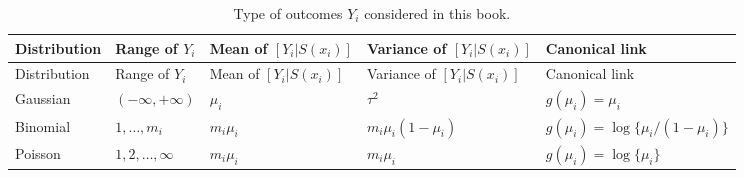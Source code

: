 \documentclass[
  letterpaper,
]{krantz}
\begin{document}
\begin{longtable}[]{@{}
  >{\raggedright\arraybackslash}p{}
  >{\raggedright\arraybackslash}p{}
  >{\raggedright\arraybackslash}p{}
  >{\raggedright\arraybackslash}p{}
  >{\raggedright\arraybackslash}p{}@{}}
\caption{Type of outcomes \(Y_{i}\) considered in this
book.}\label{tbl-glm}\tabularnewline
\toprule\noalign{}
\begin{minipage}[b]{\linewidth}\raggedright
Distribution
\end{minipage} & \begin{minipage}[b]{\linewidth}\raggedright
Range of \(Y_i\)
\end{minipage} & \begin{minipage}[b]{\linewidth}\raggedright
Mean of \([Y_i | S(x_i)]\)
\end{minipage} & \begin{minipage}[b]{\linewidth}\raggedright
Variance of \([Y_i | S(x_i)]\)
\end{minipage} & \begin{minipage}[b]{\linewidth}\raggedright
Canonical link
\end{minipage} \\
\midrule\noalign{}
\endfirsthead
\toprule\noalign{}
\begin{minipage}[b]{\linewidth}\raggedright
Distribution
\end{minipage} & \begin{minipage}[b]{\linewidth}\raggedright
Range of \(Y_i\)
\end{minipage} & \begin{minipage}[b]{\linewidth}\raggedright
Mean of \([Y_i | S(x_i)]\)
\end{minipage} & \begin{minipage}[b]{\linewidth}\raggedright
Variance of \([Y_i | S(x_i)]\)
\end{minipage} & \begin{minipage}[b]{\linewidth}\raggedright
Canonical link
\end{minipage} \\
\midrule\noalign{}
\endhead
\bottomrule\noalign{}
\endlastfoot
Gaussian & \((-\infty, +\infty)\) & \(\mu_i\) & \(\tau^2\) &
\(g(\mu_i) = \mu_i\) \\
Binomial & \(1,\dots,m_i\) & \(m_i\mu_i\) & \(m_i\mu_i(1-\mu_i)\) &
\(g(\mu_i) = \log\{ \mu_i/(1-\mu_i) \}\) \\
Poisson & \(1,2,\ldots,\infty\) & \(m_i\mu_i\) & \(m_i\mu_i\) &
\(g(\mu_i) = \log\{ \mu_i \}\) \\
\end{longtable}
\end{document}

